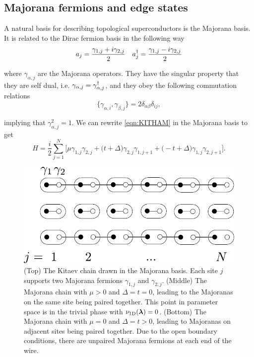 \subsection{Majorana fermions and edge states}

A natural basis for describing topological superconductors is the Majorana basis. It is related to the Dirac fermion basis in the following way
\begin{align}
    &a_{j} = \frac{\gamma_{1,j} + i\gamma_{2,j}}{2} &a_{j}^{\dagger} = \frac{\gamma_{1,j} - i\gamma_{2,j}}{2}
\end{align}

\noi where $\gamma_{\alpha,j}$ are the Majorana operators. They have the singular property that they are self dual, i.e. $\gamma_{\alpha,j}=\gamma_{\alpha,j}^{\dagger}$, and they obey the following commutation relations
\begin{equation}
    \big\{\gamma_{\alpha,i},\gamma_{\beta,j}\big\}=2\delta_{\alpha\beta}\delta_{ij},
\end{equation}

\noi implying that $\gamma_{\alpha,j}^{2}=1$. We can rewrite \eqref{eqn:KITHAM} in the Majorana basis to get
\begin{equation}\label{eqn:1DMAJHAM}
    H = \frac{i}{2}\sum_{j=1}^{N} \Big[\mu \gamma_{1,j}\gamma_{2,j} + \big(t + \Delta\big)\gamma_{2,j}\gamma_{1,j+1} + \big(-t+\Delta\big)\gamma_{1,j}\gamma_{2,j+1}\Big].
\end{equation}

\begin{figure}
    \begin{center}
        \includegraphics[scale=0.65]{Chapter1/Chapter1Figs/PDF/1DMAJ.pdf}
    \end{center}
    \caption{(Top) The Kitaev chain drawn in the Majorana basis. Each site $j$ supports two Majorana fermions $\gamma_{1,j}$ and $\gamma_{2,j}$. (Middle) The Majorana chain with $\mu>0$ and $\Delta=t=0$, leading to the Majoranas on the same site being paired together. This point in parameter space is in the trivial phase with $\nu_{\text{1D}}(\boldsymbol{\lambda})=0$. (Bottom) The Majorana chain with $\mu=0$ and $\Delta=t>0$, leading to Majoranas on adjacent sites being paired together. Due to the open boundary conditions, there are unpaired Majorana fermions at each end of the wire. }
    \label{fig:MAJCHAIN}
\end{figure}

